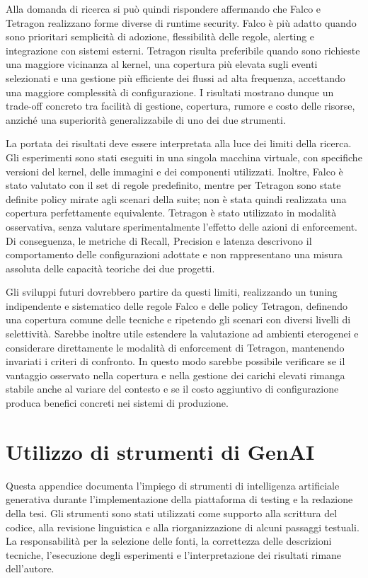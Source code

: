 \documentclass[12pt,a4paper,openright,twoside]{book}
\begin{document}
Alla domanda di ricerca si può quindi rispondere affermando che Falco e Tetragon realizzano forme diverse di runtime security. Falco è più adatto quando sono prioritari semplicità di adozione, flessibilità delle regole, alerting e integrazione con sistemi esterni. Tetragon risulta preferibile quando sono richieste una maggiore vicinanza al kernel, una copertura più elevata sugli eventi selezionati e una gestione più efficiente dei flussi ad alta frequenza, accettando una maggiore complessità di configurazione. I risultati mostrano dunque un trade-off concreto tra facilità di gestione, copertura, rumore e costo delle risorse, anziché una superiorità generalizzabile di uno dei due strumenti.

La portata dei risultati deve essere interpretata alla luce dei limiti della ricerca. Gli esperimenti sono stati eseguiti in una singola macchina virtuale, con specifiche versioni del kernel, delle immagini e dei componenti utilizzati. Inoltre, Falco è stato valutato con il set di regole predefinito, mentre per Tetragon sono state definite policy mirate agli scenari della suite; non è stata quindi realizzata una copertura perfettamente equivalente. Tetragon è stato utilizzato in modalità osservativa, senza valutare sperimentalmente l'effetto delle azioni di enforcement. Di conseguenza, le metriche di Recall, Precision e latenza descrivono il comportamento delle configurazioni adottate e non rappresentano una misura assoluta delle capacità teoriche dei due progetti.

Gli sviluppi futuri dovrebbero partire da questi limiti, realizzando un tuning indipendente e sistematico delle regole Falco e delle policy Tetragon, definendo una copertura comune delle tecniche e ripetendo gli scenari con diversi livelli di selettività. Sarebbe inoltre utile estendere la valutazione ad ambienti eterogenei e considerare direttamente le modalità di enforcement di Tetragon, mantenendo invariati i criteri di confronto. In questo modo sarebbe possibile verificare se il vantaggio osservato nella copertura e nella gestione dei carichi elevati rimanga stabile anche al variare del contesto e se il costo aggiuntivo di configurazione produca benefici concreti nei sistemi di produzione.


\appendix
\chapter{Utilizzo di strumenti di GenAI}
\label{appendix-a}

Questa appendice documenta l'impiego di strumenti di intelligenza artificiale generativa durante l'implementazione della piattaforma di testing e la redazione della tesi. Gli strumenti sono stati utilizzati come supporto alla scrittura del codice, alla revisione linguistica e alla riorganizzazione di alcuni passaggi testuali. La responsabilità per la selezione delle fonti, la correttezza delle descrizioni tecniche, l'esecuzione degli esperimenti e l'interpretazione dei risultati rimane dell'autore.
\end{document}
